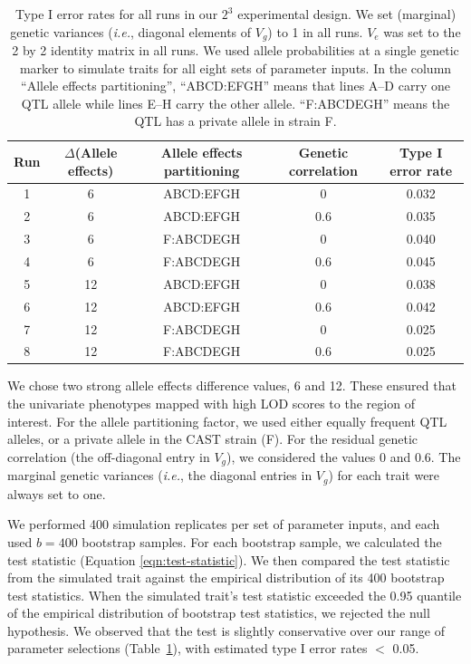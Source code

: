 \documentclass[oneside]{book}\usepackage[]{graphicx}\usepackage[]{color}
\begin{document}
\begin{table}
\begin{center}
  \caption{Type I error rates for all runs in our $2^3$
    experimental design. We set (marginal) genetic variances
    (\emph{i.e.}, diagonal elements of $V_g$) to 1 in all runs. $V_e$
    was set to the 2 by 2 identity matrix in all runs. We used allele
    probabilities at a single genetic marker to simulate traits for
    all eight sets of parameter inputs. In the
    column ``Allele effects partitioning'', ``ABCD:EFGH'' means that lines
    A--D carry one QTL allele while lines E--H carry the other allele.
    ``F:ABCDEGH'' means the QTL has a private allele in strain F.}
  \label{table-typeI}

  \bigskip

\small
  \begin{tabular}{ c | c | c | c | c}
    \hline
    Run & $\Delta$(Allele effects) & Allele effects partitioning & Genetic correlation & Type I error rate \\ \hline
    1 & 6 & ABCD:EFGH & 0 & 0.032\\
    2 & 6 & ABCD:EFGH & 0.6 & 0.035\\
    3 & 6 & F:ABCDEGH & 0 & 0.040\\
    4 & 6 & F:ABCDEGH & 0.6 & 0.045\\
    5 & 12 & ABCD:EFGH & 0 & 0.038\\
    6 & 12 & ABCD:EFGH & 0.6 & 0.042\\
    7 & 12 & F:ABCDEGH & 0 & 0.025\\
    8 & 12 & F:ABCDEGH & 0.6 & 0.025\\
    \hline
  \end{tabular}
\end{center}
  \end{table}

We chose two strong allele effects difference values, 6 and 12. These
ensured that the univariate phenotypes mapped with high LOD scores to
the region of interest. For the allele partitioning factor, we used
either equally frequent QTL alleles, or a private allele in the CAST
strain (F). For the residual genetic correlation (the off-diagonal
entry in $V_g$), we considered the values 0 and 0.6. The marginal
genetic variances (\textit{i.e.}, the diagonal entries in $V_g$) for
each trait were always set to one.

We performed 400 simulation replicates per set of parameter inputs,
and each used $b = 400$ bootstrap samples. For each bootstrap sample, we calculated the
test statistic (Equation \ref{eqn:test-statistic}). We then compared
the test statistic from the simulated trait against the empirical
distribution of its 400 bootstrap test statistics. When the simulated
trait's test statistic exceeded the 0.95 quantile of the empirical
distribution of bootstrap test statistics, we rejected the null
hypothesis. We observed that the test is slightly conservative over
our range of parameter selections (Table~\ref{table-typeI}), with
estimated type I error rates $<$ 0.05.
\end{document}
